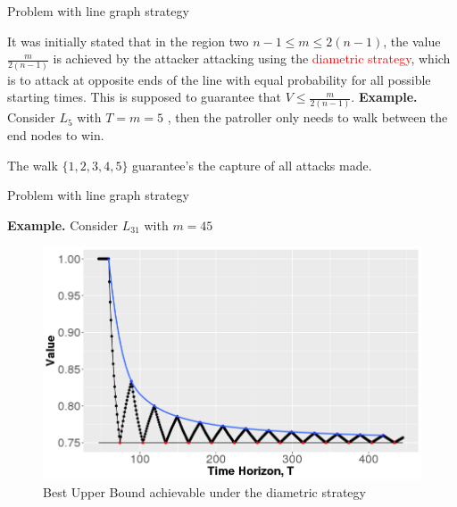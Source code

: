 \documentclass[11pt]{beamer}
\begin{document}
\hypertarget{Problem with line graph strategy}{}
\begin{frame}{Problem with line graph strategy}

It was initially stated that in the region two $n-1 \leq m \leq 2(n-1)$, the value $\frac{m}{2(n-1)}$ is achieved by the attacker attacking using the \textcolor{red}{diametric strategy}, which is to attack at opposite ends of the line with equal probability for all possible starting times. This is supposed to guarantee that $V \leq \frac{m}{2(n-1)}$.
\newline
\newline
\textbf{Example.}
Consider $L_{5}$ with $T=m=5$ , then the patroller only needs to walk between the end nodes to win.
\begin{center}
\end{center}
The walk $\{ 1,2,3,4,5 \}$ guarantee's the capture of all attacks made.

\end{frame}

\begin{frame}{Problem with line graph strategy}

\textbf{Example.}
Consider $L_{31}$ with $m=45$

\begin{figure}
\includegraphics[scale=0.4]{DiametricAttack(m_45,d_30).png}
\caption{Best Upper Bound achievable under the diametric strategy}
\end{figure}

\end{frame}
\end{document}
